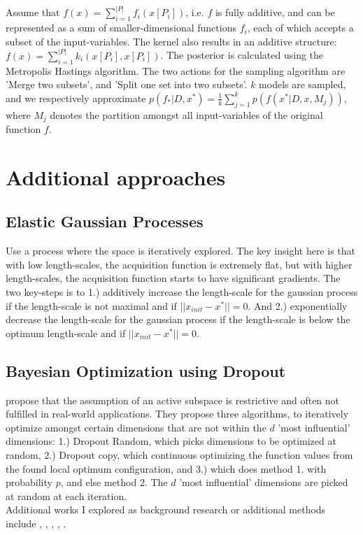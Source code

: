 \citep{Gardner2017} Assume that $f(x) = \sum_{i=1}^{ |P| } f_i (x[P_i] )$, i.e. $f$ is fully additive, and can be represented as a sum of smaller-dimensional functions $f_i$, each of which accepts a subset of the input-variables.
The kernel also results in an additive structure: $f(x) = \sum_{i=1}^{ |P| } k_i (x[P_i], x[P_i])$.
The posterior is calculated using the Metropolis Hastings algorithm.
The two actions for the sampling algorithm are 'Merge two subsets', and 'Split one set into two subsets'.
$k$ models are sampled, and we respectively approximate $p(f_* | D, x^*) = \frac{1}{k} \sum_{j=1}^{k} p( f(x^* | D, x, M_j) )$, where $M_j$ denotes the partition amongst all input-variables of the original function $f$.

\section{Additional approaches}

\subsection{Elastic Gaussian Processes}

\citep{Rana2017} Use a process where the space is iteratively explored.
The key insight here is that with low length-scales, the acquisition function is extremely flat, but with higher length-scales, the acquisition function starts to have significant gradients.
The two key-steps is to 1.) additively increase the length-scale for the gaussian process if the length-scale is not maximal and if $|| x_{init} - x^* || = 0$.
And 2.) exponentially decrease the length-scale for the gaussian process if the length-scale is below the optimum length-scale and if $|| x_{init} - x^* || = 0$.


\subsection{Bayesian Optimization using Dropout}

\citep{Li2018} propose that the assumption of an active subspace is restrictive and often not fulfilled in real-world applications.
They propose three algorithms, to iteratively optimize amongst certain dimensions that are not within the $d$ 'most influential' dimensions: 1.) Dropout Random, which picks dimensions to be optimized at random, 2.) Dropout copy, which continuous optimizing the function values from the found local optimum configuration, and 3.) which does method 1. with probability $p$, and else method 2.
The $d$ 'most influential' dimensions are picked at random at each iteration. \\

Additional works I explored as background research or additional methods include \citep{KernelGibbsSampler}, \citep{VirtualVsReal}, \citep{SensorPlacement}, \citep{BatchedBO}, \citep{GPforML}.
